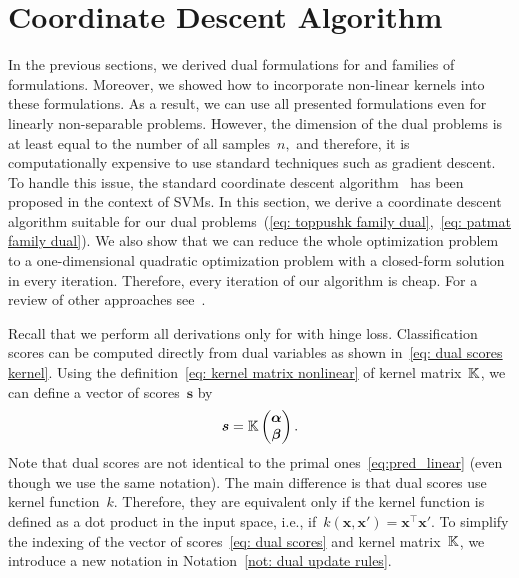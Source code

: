 \section{Coordinate Descent Algorithm}\label{sec: coordinate descent}

In the previous sections, we derived dual formulations for \TopPushK and \PatMat families of formulations. Moreover, we showed how to incorporate non-linear kernels into these formulations. As a result, we can use all presented formulations even for linearly non-separable problems. However, the dimension of the dual problems is at least equal to the number of all samples~$n,$ and therefore, it is computationally expensive to use standard techniques such as gradient descent. To handle this issue, the standard coordinate descent algorithm~\cite{chang2008coordinate, hsieh2008dual} has been proposed in the context of SVMs. In this section, we derive a coordinate descent algorithm suitable for our dual problems~(\ref{eq: toppushk family dual},~\ref{eq: patmat family dual}). We also show that we can reduce the whole optimization problem to a one-dimensional quadratic optimization problem with a closed-form solution in every iteration. Therefore, every iteration of our algorithm is cheap. For a review of other approaches see~\cite{batmaz2019review,werner2019review}. 

Recall that we perform all derivations only for \TopPushK with hinge loss. Classification scores can be computed directly from dual variables as shown in~\eqref{eq: dual scores kernel}. Using the definition~\eqref{eq: kernel matrix nonlinear} of kernel matrix~$\mathbb{K}$, we can define a vector of scores~$\bm{s}$ by
\begin{equation}\label{eq: dual scores}
  \bm{s} = \mathbb{K} \begin{pmatrix} \bm{\alpha} \\ \bm{\beta} \end{pmatrix}.
\end{equation}
Note that dual scores are not identical to the primal ones~\eqref{eq:pred_linear} (even though we use the same notation). The main difference is that dual scores use kernel function~$k.$ Therefore, they are equivalent only if the kernel function is defined as a dot product in the input space, i.e., if~$k(\bm{x}, \bm{x}') = \bm{x}^{\top} \bm{x}'.$ To simplify the indexing of the vector of scores~\eqref{eq: dual scores} and kernel matrix~$\mathbb{K}$, we introduce a new notation in Notation~\ref{not: dual update rules}.

